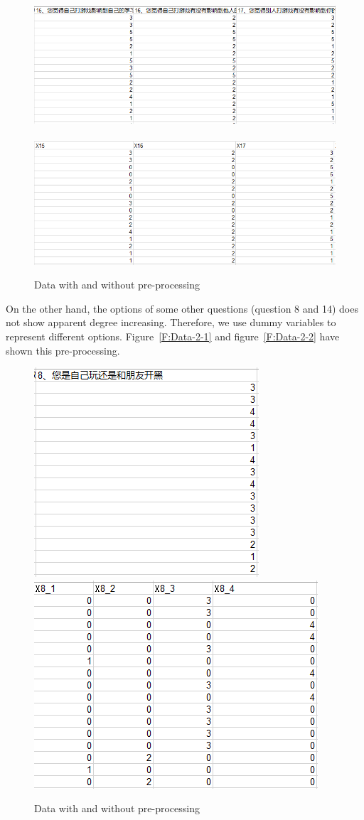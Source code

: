 \documentclass[scheme=plain]{ctexart}
\begin{document}
\begin{figure}[H]
    \centering
        {\includegraphics[width=.45\textwidth]{0}}
    $\quad$
        {\includegraphics[width=.42\textwidth]{1}}
    \caption{Data with and without pre-processing}\label{F:Data-1}
\end{figure}

On the other hand, the options of some other questions (question 8 and 14) does not show apparent degree increasing. Therefore, we use dummy variables to represent different options. Figure~\ref{F:Data-2-1} and
figure~\ref{F:Data-2-2} have shown this pre-processing.

\begin{figure}[H]
    \centering
        {\includegraphics[width=.35\textwidth]{2}}
    $\quad$
        {\includegraphics[width=.45\textwidth]{3}}
    \caption{Data with and without pre-processing}\label{F:Data-2}
\end{figure}
\end{document}
